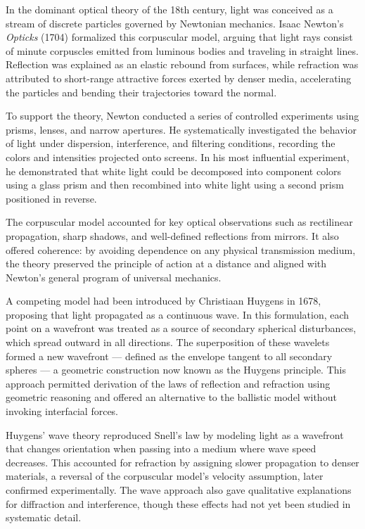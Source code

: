 In the dominant optical theory of the 18th century, light was conceived as a stream of discrete particles governed by Newtonian mechanics. Isaac Newton's \textit{Opticks} (1704) formalized this corpuscular model, arguing that light rays consist of minute corpuscles emitted from luminous bodies and traveling in straight lines. Reflection was explained as an elastic rebound from surfaces, while refraction was attributed to short-range attractive forces exerted by denser media, accelerating the particles and bending their trajectories toward the normal.

To support the theory, Newton conducted a series of controlled experiments using prisms, lenses, and narrow apertures. He systematically investigated the behavior of light under dispersion, interference, and filtering conditions, recording the colors and intensities projected onto screens. In his most influential experiment, he demonstrated that white light could be decomposed into component colors using a glass prism and then recombined into white light using a second prism positioned in reverse.

The corpuscular model accounted for key optical observations such as rectilinear propagation, sharp shadows, and well-defined reflections from mirrors. It also offered coherence: by avoiding dependence on any physical transmission medium, the theory preserved the principle of action at a distance and aligned with Newton's general program of universal mechanics.

A competing model had been introduced by Christiaan Huygens in 1678, proposing that light propagated as a continuous wave. In this formulation, each point on a wavefront was treated as a source of secondary spherical disturbances, which spread outward in all directions. The superposition of these wavelets formed a new wavefront — defined as the envelope tangent to all secondary spheres — a geometric construction now known as the Huygens principle. This approach permitted derivation of the laws of reflection and refraction using geometric reasoning and offered an alternative to the ballistic model without invoking interfacial forces.

Huygens' wave theory reproduced Snell's law by modeling light as a wavefront that changes orientation when passing into a medium where wave speed decreases. This accounted for refraction by assigning slower propagation to denser materials, a reversal of the corpuscular model's velocity assumption, later confirmed experimentally. The wave approach also gave qualitative explanations for diffraction and interference, though these effects had not yet been studied in systematic detail.

